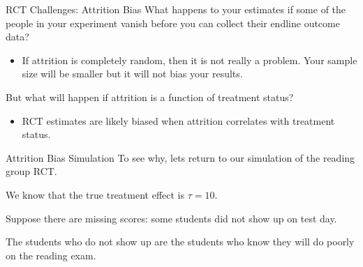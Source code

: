 \documentclass[
  ignorenonframetext,
]{beamer}
\providecommand{\tightlist}{%
  \setlength{\itemsep}{0pt}\setlength{\parskip}{0pt}}
\begin{document}
\begin{frame}{RCT Challenges: Attrition Bias}
\protect\hypertarget{rct-challenges-attrition-bias}{}
What happens to your estimates if some of the people in your experiment
vanish before you can collect their endline outcome data?

\begin{itemize}
\tightlist
\item
  If attrition is completely random, then it is not really a problem.
  Your sample size will be smaller but it will not bias your results.
\end{itemize}

But what will happen if attrition is a function of treatment status?

\begin{itemize}
\tightlist
\item
  RCT estimates are likely biased when attrition correlates with
  treatment status.
\end{itemize}
\end{frame}

\begin{frame}{Attrition Bias Simulation}
\protect\hypertarget{attrition-bias-simulation}{}
To see why, lets return to our simulation of the reading group RCT.

We know that the true treatment effect is \(\tau=10\).

Suppose there are missing scores: some students did not show up on test
day.

The students who do not show up are the students who know they will do
poorly on the reading exam.
\end{frame}
\end{document}
